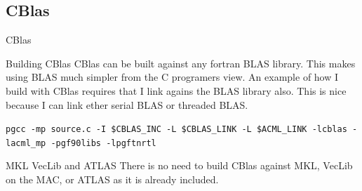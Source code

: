 \documentclass[handout]{beamer}
\begin{document}
\subsection{CBlas}
\begin{frame}{CBlas}
\begin{block}{Building CBlas}
 CBlas can be built against any fortran BLAS library. This makes using BLAS much simpler from the C programers view. An example of how I build with CBlas requires that I link agains the BLAS library also.  This is nice because I can link ether serial BLAS or threaded BLAS.
\end{block}
\texttt{pgcc -mp source.c -I \$CBLAS\_INC -L \$CBLAS\_LINK -L \$ACML\_LINK -lcblas -lacml\_mp -pgf90libs -lpgftnrtl}       \\
\begin{block}{MKL VecLib and ATLAS}
There is no need to build CBlas against MKL, VecLib on the MAC, or ATLAS as it is already included.
\end{block}
\end{frame}
\end{document}
